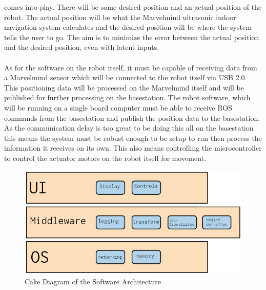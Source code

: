\documentclass[english,12pt]{article}
\begin{document}
comes into play. There will be some desired position and an actual position of the robot. The actual
position will be what the Marvelmind ultrasonic indoor navigation system calculates and the desired
position will be where the system tells the user to go. The aim is to minimize the error between the
actual position and the desired position, even with latent inputs.\\\\
As for the software on the robot itself, it must be capable of receiving data from a Marvelmind sensor
which will be connected to the robot itself via USB 2.0. This positioning data will be processed on the
Marvelmind itself and will be published for further processing on the basestation. The robot software,
which will be running on a single board computer must be able to receive ROS commands from the basestation
and publish the position data to the basestation. As the communication delay is too great to be doing
this all on the basestation this means the system must be robust enough to be setup to run then process
the information it receives on its own. This also means controlling the microcontroller to
control the actuator motors on the robot itself for movement.
\begin{figure}
    \centerline{\includegraphics[scale = 2.5]{cake.jpeg}}
    \caption{Cake Diagram of the Software Architecture}
\end{figure}
\end{document}
